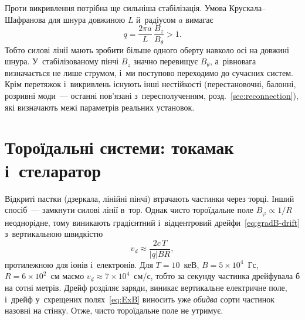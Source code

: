 Проти викривлення потрібна ще сильніша стабілізація. Умова Крускала--Шафранова для
шнура довжиною $L$ й~радіусом $a$ вимагає
\begin{equation*}
	q=\frac{2\pi a}L\,\frac{B_z}{B_\theta}>1.
\end{equation*}
Тобто силові лінії мають зробити більше одного оберту навколо осі на довжині шнура.
У~стабілізованому пінчі $B_z$ значно перевищує $B_\theta$, а~рівновага визначається не
лише струмом, і~ми поступово переходимо до сучасних систем. Крім перетяжок і~викривлень
існують інші нестійкості (перестановочні, балонні, розривні моди~--- останні пов'язані з~пересполученням, розд.~\ref{sec:reconnection}), які визначають межі
параметрів реальних установок.

\section{Тороїдальні системи: токамак і~стеларатор}\label{sec:toroidal}

Відкриті пастки (дзеркала, лінійні пінчі) втрачають частинки через торці. Інший спосіб~---
замкнути силові лінії в~тор. Однак чисто тороїдальне поле $B_\varphi\propto1/R$
неоднорідне, тому виникають градієнтний і~відцентровий дрейфи~\eqref{eq:gradB-drift}
з~вертикальною швидкістю
\begin{equation*}
	v_d\approx\frac{2c\,T}{|q|BR},
\end{equation*}
протилежною для іонів і~електронів. Для $T=10$~кеВ, $B=5\times10^4$~Гс,
$R=6\times10^2$~см маємо $v_d\approx7\times10^4$~см/с, тобто за секунду частинка дрейфувала б
на сотні метрів. Дрейф розділяє заряди, виникає вертикальне електричне поле, і~дрейф
у~схрещених полях~\eqref{eq:ExB} виносить уже \emph{обидва} сорти частинок назовні на
стінку. Отже, чисто тороїдальне поле не утримує.

